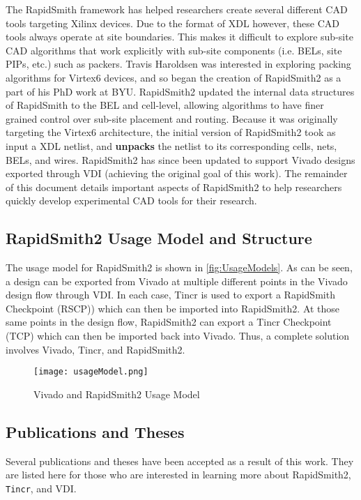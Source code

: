 The RapidSmith framework has helped researchers create several different CAD
tools targeting Xilinx devices. Due to the format of XDL however, these CAD
tools always operate at site boundaries. This makes it difficult to explore sub-site CAD
algorithms that work explicitly with sub-site components (i.e. BELs, site PIPs,
etc.) such as packers. Travis Haroldsen was interested in exploring packing
algorithms for Virtex6 devices, and so began the creation of RapidSmith2 as a
part of his PhD work at BYU.
RapidSmith2 updated the internal data structures of RapidSmith to the BEL and cell-level, allowing
algorithms to have finer grained control over sub-site placement and routing. 
Because it was originally targeting the Virtex6 architecture, the initial
version of RapidSmith2 took as input a XDL netlist, and \textbf{unpacks} the
netlist to its corresponding cells, nets, BELs, and wires. RapidSmith2 has
since been updated to support Vivado designs exported through VDI (achieving
the original goal of this work). The remainder of this document details
important aspects of RapidSmith2 to help researchers quickly develop
experimental CAD tools for their research.

\subsection{RapidSmith2 Usage Model and Structure}
The usage model for RapidSmith2 is shown in \autoref{fig:UsageModels}.  As can be
seen, a design can be exported from Vivado at multiple different points in the
Vivado design flow through VDI. In each case, Tincr is used to export a
RapidSmith Checkpoint (RSCP)) which can then be imported into RapidSmith2.  At
those same points in the design flow, RapidSmith2 can export a Tincr Checkpoint
(TCP) which can then be imported back into Vivado. Thus, a complete solution
involves Vivado, Tincr, and RapidSmith2.

\begin{figure}[htb]
\centering
\texttt{[image: usageModel.png]}
\caption{Vivado and RapidSmith2 Usage Model}
\label{fig:UsageModels}
\end{figure}

\subsection{Publications and Theses}
Several publications and theses have been accepted as a result of this work.
They are listed here for those who are interested in learning more about RapidSmith2,
\texttt{Tincr}, and VDI.

